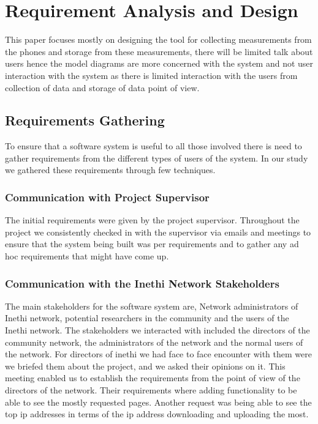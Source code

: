 \section{Requirement Analysis and Design}\label{sec:design-decision}
This paper focuses mostly on designing the tool for collecting measurements from the phones and storage from these measurements, there will be limited talk about users hence the model diagrams are more concerned with the system and not user interaction with the system as there is limited interaction with the users from collection of data and storage of data point of view.
\subsection{Requirements Gathering}\label{subsec:requirements-gathering}
To ensure that a software system is useful to all those involved there is need to gather requirements from the different types of users of the system.
In our study we gathered these requirements through few techniques.
\subsubsection{Communication with Project Supervisor}
The initial requirements were given by the project supervisor.
Throughout the project we consistently checked in with the supervisor via emails and meetings to ensure that the system being built was per requirements and to gather any ad hoc requirements that might have come up.
\subsubsection{Communication with the Inethi Network Stakeholders}
The main stakeholders for the software system are, Network administrators of Inethi network, potential researchers in the community and the users of the Inethi network.
The stakeholders we interacted with included the directors of the community network, the administrators of the network and the normal users of the network.
For directors of inethi we had face to face encounter with them were we briefed them about the project, and we asked their opinions on it.
This meeting enabled us to establish the requirements from the point of view of the directors of the network.
Their requirements where adding functionality to be able to see the mostly requested pages.
Another request was being able to see the top ip addresses in terms of the ip address downloading and uploading the most.
